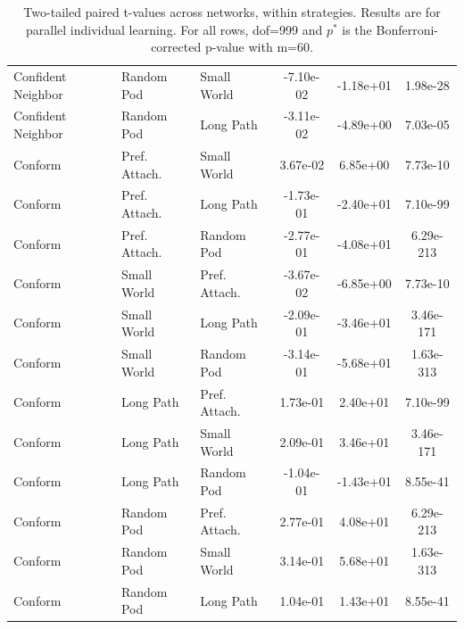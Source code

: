\begin{table}[]
\begin{tabular}{l|ll|ccc}
Confident Neighbor&Random Pod&Small World&-7.10e-02&-1.18e+01&1.98e-28\\
Confident Neighbor&Random Pod&Long Path&-3.11e-02&-4.89e+00&7.03e-05\\
\hline
Conform&Pref. Attach.&Small World&3.67e-02&6.85e+00&7.73e-10\\
Conform&Pref. Attach.&Long Path&-1.73e-01&-2.40e+01&7.10e-99\\
Conform&Pref. Attach.&Random Pod&-2.77e-01&-4.08e+01&6.29e-213\\
Conform&Small World&Pref. Attach.&-3.67e-02&-6.85e+00&7.73e-10\\
Conform&Small World&Long Path&-2.09e-01&-3.46e+01&3.46e-171\\
Conform&Small World&Random Pod&-3.14e-01&-5.68e+01&1.63e-313\\
Conform&Long Path&Pref. Attach.&1.73e-01&2.40e+01&7.10e-99\\
Conform&Long Path&Small World&2.09e-01&3.46e+01&3.46e-171\\
Conform&Long Path&Random Pod&-1.04e-01&-1.43e+01&8.55e-41\\
Conform&Random Pod&Pref. Attach.&2.77e-01&4.08e+01&6.29e-213\\
Conform&Random Pod&Small World&3.14e-01&5.68e+01&1.63e-313\\
Conform&Random Pod&Long Path&1.04e-01&1.43e+01&8.55e-41\\
    \hline
    \end{tabular}
    \caption{Two-tailed paired t-values across networks, within strategies. Results are for parallel individual learning. For all rows, dof=999 and $p^*$ is the Bonferroni-corrected p-value with m=60.}
    \label{tab:t-instrat-parallel}
\end{table}


